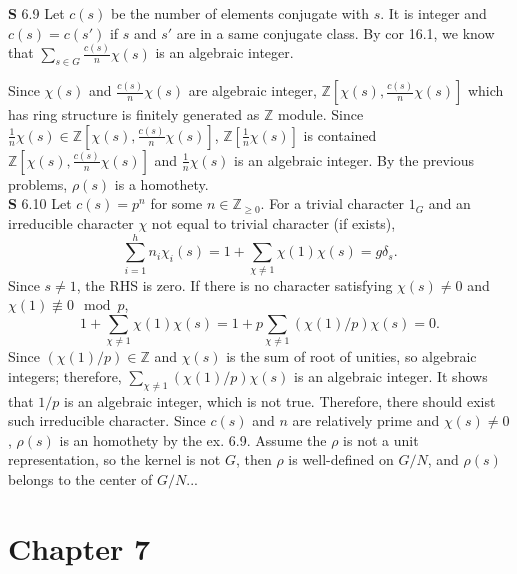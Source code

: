 \documentclass[a4paper, 12pt]{article}
\theoremstyle{Mydefinition}
\theoremstyle{Mytheorem}
\begin{document}
\noindent \textbf{S} 6.9
Let $c(s)$ be the number of elements conjugate with $s$. It is integer and $c(s) = c(s')$ if $s$ and $s'$ are in a same conjugate class. By cor 16.1, we know that $\sum_{s\in G}\frac{c(s)}{n}\chi(s)$ is an algebraic integer.

Since $\chi(s)$ and $\frac{c(s)}{n}\chi(s)$ are algebraic integer, $\mathbb{Z}\left[\chi(s), \frac{c(s)}{n}\chi(s)\right]$ which has ring structure is finitely generated as $\mathbb{Z}$ module. Since $\frac{1}{n}\chi(s)\in \mathbb{Z}\left[\chi(s), \frac{c(s)}{n}\chi(s)\right]$, $\mathbb{Z}\left[\frac{1}{n}\chi(s)\right]$ is contained $\mathbb{Z}\left[\chi(s), \frac{c(s)}{n}\chi(s)\right]$ and $\frac{1}{n}\chi(s)$ is an algebraic integer. By the previous problems, $\rho(s)$ is a homothety.\\

\noindent \textbf{S} 6.10
Let $c(s) = p^n$ for some $n\in\mathbb{Z}_{\geq 0}$. For a trivial character $1_G$ and an irreducible character $\chi$ not equal to trivial character (if exists),
\begin{equation}
    \sum_{i=1}^h n_i\chi_i(s) = 1 + \sum_{\chi\neq 1}\chi(1)\chi(s) = g\delta_{s}.
\end{equation}
Since $s\neq 1$, the RHS is zero. If there is no character satisfying $\chi(s)\neq 0$ and $\chi(1)\not\equiv 0\mod p$,
\begin{equation}
    1 + \sum_{\chi\neq 1}\chi(1)\chi(s) = 1+p\sum_{\chi\neq 1}(\chi(1)/p)\chi(s) = 0.
\end{equation}
Since $(\chi(1)/p)\in\mathbb{Z}$ and $\chi(s)$ is the sum of root of unities, so algebraic integers; therefore, $\sum_{\chi\neq 1}(\chi(1)/p)\chi(s)$ is an algebraic integer. It shows that $1/p$ is an algebraic integer, which is not true. Therefore, there should exist such irreducible character. Since $c(s)$ and $n$ are relatively prime and $\chi(s)\neq 0$, $\rho(s)$ is an homothety by the ex. 6.9. Assume the $\rho$ is not a unit representation, so the kernel is not $G$, then $\rho$ is well-defined on $G/N$, and $\rho(s)$ belongs to the center of $G/N$...
\newpage

\section{Chapter 7}
\end{document}
